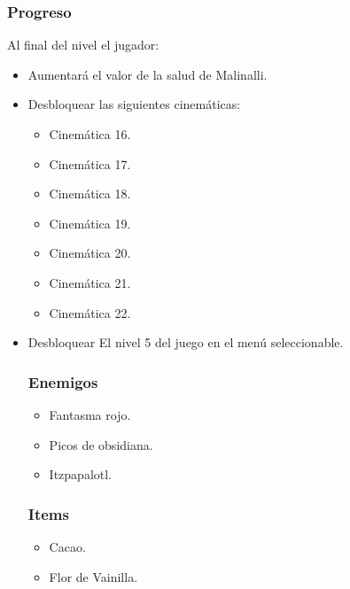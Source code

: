 \documentclass[11pt,letterpaper]{article}
\begin{document}
        \subsubsection{Progreso}
Al final del nivel el jugador:
\begin{itemize}
        \item Aumentará el valor de la salud de Malinalli.
        \item Desbloquear las siguientes cinemáticas:
		\begin{itemize}
			\item Cinemática 16.
			\item Cinemática 17.
			\item Cinemática 18.
			\item Cinemática 19.
			\item Cinemática 20.
			\item Cinemática 21.
			\item Cinemática 22.
		\end{itemize}
        \item Desbloquear El nivel 5 del juego en el menú seleccionable.
        \subsubsection{Enemigos}
                \begin{itemize}
                        \item Fantasma rojo. 
                        \item Picos de obsidiana. 
                        \item Itzpapalotl.
                \end{itemize}
        \subsubsection{Items}
                \begin{itemize}
                        \item   Cacao.
                        \item Flor de Vainilla.
                \end{itemize}

\end{itemize}
\end{document}
